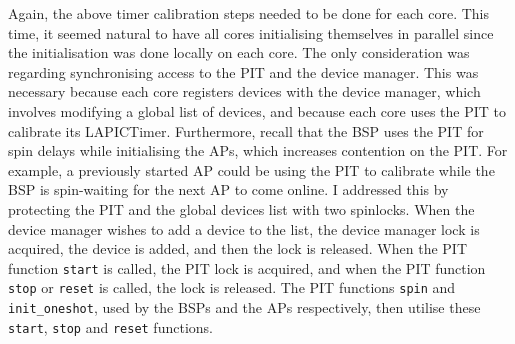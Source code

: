 \documentclass[bsc,frontabs,singlespacing,parskip,deptreport]{infthesis}
\begin{document}
Again, the above timer calibration steps needed to be done for each core. This time, it seemed natural to have all cores initialising themselves in parallel since the initialisation was done locally on each core. The only consideration was regarding synchronising access to the PIT and the device manager. This was necessary because each core registers devices with the device manager, which involves modifying a global list of devices, and because each core uses the PIT to calibrate its LAPICTimer. Furthermore, recall that the BSP uses the PIT for spin delays while initialising the APs, which increases contention on the PIT. For example, a previously started AP could be using the PIT to calibrate while the BSP is spin-waiting for the next AP to come online. I addressed this by protecting the PIT and the global devices list with two spinlocks. When the device manager wishes to add a device to the list, the device manager lock is acquired, the device is added, and then the lock is released. When the PIT function \verb|start| is called, the PIT lock is acquired, and when the PIT function \verb|stop| or \verb|reset| is called, the lock is released. The PIT functions \verb|spin| and \verb|init_oneshot|, used by the BSPs and the APs respectively, then utilise these \verb|start|, \verb|stop| and \verb|reset| functions.

\end{document}
